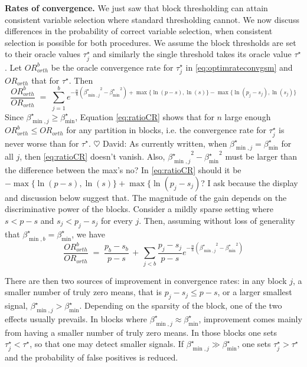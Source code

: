 \documentclass[aos]{imsart}
\theoremstyle{plain}
\newcommand{\david}[1]{{\small{\color{blue} \sf $\heartsuit$ David: #1}}}
\begin{document}
\bigskip

\noindent\textbf{Rates of convergence.}   We just saw that block thresholding can attain consistent variable selection where standard thresholding cannot. We now discuss differences in the probability of correct variable selection, when consistent selection is possible for both procedures. We assume the block thresholds %
are set to their oracle values $\tau_j^\star$ %
and similarly the single threshold %
takes its oracle value $\tau^\star$.
Let ${OR}^b_{orth}$ be the oracle convergence rate for $\tau_j^\star$ %
in \eqref{eq:optimrateconvgsm} and ${OR}_{orth}$ that for $\tau^\star$. %
Then
\begin{equation}\label{eq:ratioCR}
    \frac{{OR}^b_{orth}}{{OR}_{orth}}\;=\;\sum_{j=1}^be^{-\frac{n}{8}\left({\beta^\star_{\min,j}}^2-{\beta_{\min}^\star}^2\right)+\max\{\ln(p-s),\ln(s)\}-\max\{\ln(p_j-s_j),\ln(s_j)\}}
\end{equation}
Since $\beta_{\min,j}^\star \geq \beta_{\min}^\star$, Equation \eqref{eq:ratioCR} shows that for $n$ large enough ${OR}^b_{orth} \leq {OR}_{orth}$ for any partition in blocks, i.e. the convergence rate for $\tau_j^\star$ is never worse than for $\tau^\star$. \david{As currently written, when $\beta_{\min,j}^\star = \beta_{\min}^\star$ for all $j$, then \eqref{eq:ratioCR} doesn't vanish. Also, ${\beta^\star_{\min,j}}^2-{\beta_{\min}^\star}^2$ must be larger than the difference between the max's no? In \eqref{eq:ratioCR} should it be $-\max\{\ln(p-s),\ln(s)\}+\max\{\ln(p_j-s_j)$? I ask because the display and discussion below suggest that.}
The magnitude of the gain depends on the discriminative power of the blocks.
Consider a mildly sparse setting where $s<p-s$ and $s_j<p_j-s_j$ for every $j$. Then, assuming without loss of generality that $\beta_{\min,b}^\star=\beta_{\min}^\star$, we have
\begin{equation*}
    \frac{{OR}^b_{orth}}{{OR}_{orth}}\;=\; \frac{p_b-s_b}{p-s} \,+\,\sum_{j<b}\frac{p_j-s_j}{p-s}e^{-\frac{n}{8}\left({\beta^\star_{\min,j}}^2-{\beta_{\min}^\star}^2\right)}
\end{equation*}

There are then two sources of improvement in convergence rates: in any block $j$, a smaller number of truly zero means, that is $p_j-s_j\leq p-s$, or a larger smallest signal, $\beta^\star_{\min,j} > \beta_{\min}^\star$. Depending on the sparsity of the block, one of the two effects usually prevails. In blocks where $\beta^\star_{\min,j} \approx \beta_{\min}^\star$, improvement comes mainly from having a smaller number of truly zero means. In those blocks
one sets $\tau^\star_j < \tau^\star$, so that one may detect smaller signals. 
If %
$\beta^\star_{\min,j} \gg \beta_{\min}^\star$,
one sets $\tau^\star_j > \tau^\star$
and the probability of false positives is reduced.
\end{document}
